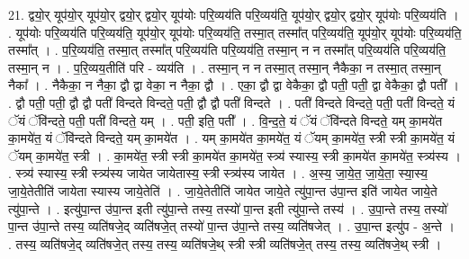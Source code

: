 \documentclass[17pt]{extarticle}
\begin{document}
21. द्वयो॒र् यूप॑यो॒र् यूप॑यो॒र् द्वयो॒र् द्वयो॒र् यूप॑योः परि॒व्यय॑ति परि॒व्यय॑ति॒ यूप॑यो॒र् द्वयो॒र् द्वयो॒र् यूप॑योः परि॒व्यय॑ति । . यूप॑योः परि॒व्यय॑ति परि॒व्यय॑ति॒ यूप॑यो॒र् यूप॑योः परि॒व्यय॑ति॒ तस्मा॒त् तस्मा᳚त् परि॒व्यय॑ति॒ यूप॑यो॒र् यूप॑योः परि॒व्यय॑ति॒ तस्मा᳚त् । . प॒रि॒व्यय॑ति॒ तस्मा॒त् तस्मा᳚त् परि॒व्यय॑ति परि॒व्यय॑ति॒ तस्मा॒न् न न तस्मा᳚त् परि॒व्यय॑ति परि॒व्यय॑ति॒ तस्मा॒न् न । . प॒रि॒व्यय॒तीति॑ परि - व्यय॑ति । . तस्मा॒न् न न तस्मा॒त् तस्मा॒न् नैकैका॒ न तस्मा॒त् तस्मा॒न् नैका᳚ । . नैकैका॒ न नैका॒ द्वौ द्वा वेका॒ न नैका॒ द्वौ । . एका॒ द्वौ द्वा वेकैका॒ द्वौ पती॒ पती॒ द्वा वेकैका॒ द्वौ पती᳚ । . द्वौ पती॒ पती॒ द्वौ द्वौ पती॑ विन्दते विन्दते॒ पती॒ द्वौ द्वौ पती॑ विन्दते । . पती॑ विन्दते विन्दते॒ पती॒ पती॑ विन्दते॒ यं ॅयं ॅवि॑न्दते॒ पती॒ पती॑ विन्दते॒ यम् । . पती॒ इति॒ पती᳚ । . वि॒न्द॒ते॒ यं ॅयं ॅवि॑न्दते विन्दते॒ यम् का॒मये॑त का॒मये॑त॒ यं ॅवि॑न्दते विन्दते॒ यम् का॒मये॑त । . यम् का॒मये॑त का॒मये॑त॒ यं ॅयम् का॒मये॑त॒ स्त्री स्त्री का॒मये॑त॒ यं ॅयम् का॒मये॑त॒ स्त्री । . का॒मये॑त॒ स्त्री स्त्री का॒मये॑त का॒मये॑त॒ स्त्र्य॑ स्यास्य॒ स्त्री का॒मये॑त का॒मये॑त॒ स्त्र्य॑स्य । . स्त्र्य॑ स्यास्य॒ स्त्री स्त्र्य॑स्य जायेत जायेतास्य॒ स्त्री स्त्र्य॑स्य जायेत । . अ॒स्य॒ जा॒ये॒त॒ जा॒ये॒ता॒ स्या॒स्य॒ जा॒ये॒तेतीति॑ जायेता स्यास्य जाये॒तेति॑ । . जा॒ये॒तेतीति॑ जायेत जाये॒ते त्यु॑पा॒न्त उ॑पा॒न्त इति॑ जायेत जाये॒ते त्यु॑पा॒न्ते । . इत्यु॑पा॒न्त उ॑पा॒न्त इती त्यु॑पा॒न्ते तस्य॒ तस्यो॑ पा॒न्त इती त्यु॑पा॒न्ते तस्य॑ । . उ॒पा॒न्ते तस्य॒ तस्यो॑ पा॒न्त उ॑पा॒न्ते तस्य॒ व्यति॑षजे॒द् व्यति॑षजे॒त् तस्यो॑ पा॒न्त उ॑पा॒न्ते तस्य॒ व्यति॑षजेत् । . उ॒पा॒न्त इत्यु॑प - अ॒न्ते । . तस्य॒ व्यति॑षजे॒द् व्यति॑षजे॒त् तस्य॒ तस्य॒ व्यति॑षजे॒थ् स्त्री स्त्री व्यति॑षजे॒त् तस्य॒ तस्य॒ व्यति॑षजे॒थ् स्त्री । \newline
\end{document}
